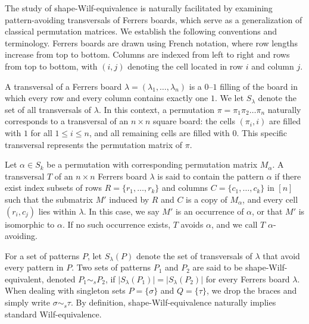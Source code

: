 \documentclass[12pt, english, a4paper]{article}
\newcommand{\card}[1]{\lvert #1 \rvert}
\theoremstyle{plain}
\theoremstyle{definition}
\theoremstyle{remark}
\begin{document}
The study of shape-Wilf-equivalence is naturally facilitated by examining pattern-avoiding transversals of Ferrers boards, which serve as a generalization of classical permutation matrices. We establish the following conventions and terminology. Ferrers boards are drawn using French notation, where row lengths increase from top to bottom. Columns are indexed from left to right and rows from top to bottom, with $(i,j)$ denoting the cell located in row $i$ and column $j$.

A transversal of a Ferrers board $\lambda=(\lambda_1,\dots,\lambda_n)$ is a $0$--$1$ filling of the board in which every row and every column contains exactly one $1$. We let $S_\lambda$ denote the set of all transversals of $\lambda$. In this context, a permutation $\pi=\pi_1\pi_2\dots\pi_n$ naturally corresponds to a transversal of an $n \times n$ square board: the cells $(\pi_i,i)$ are filled with $1$ for all $1 \le i \le n$, and all remaining cells are filled with $0$. This specific transversal represents the permutation matrix of $\pi$.

Let $\alpha \in S_k$ be a permutation with corresponding permutation matrix $M_\alpha$. A transversal $T$ of an $n \times n$ Ferrers board $\lambda$ is said to contain the pattern $\alpha$ if there exist index subsets of rows $R = \{r_1, \dots, r_k\}$ and columns $C = \{c_1, \dots, c_k\}$ in $[n]$ such that the submatrix $M'$ induced by $R$ and $C$ is a copy of $M_\alpha$, and every cell $(r_i, c_j)$ lies within $\lambda$. In this case, we say $M'$ is an occurrence of $\alpha$, or that $M'$ is isomorphic to $\alpha$. If no such occurrence exists, $T$ avoids $\alpha$, and we call $T$ $\alpha$-avoiding.

For a set of patterns $P$, let $S_\lambda(P)$ denote the set of transversals of $\lambda$ that avoid every pattern in $P$. Two sets of patterns $P_1$ and $P_2$ are said to be shape-Wilf-equivalent, denoted $P_1 \sim_s P_2$, if $\card{S_\lambda(P_1)} = \card{S_\lambda(P_2)}$ for every Ferrers board $\lambda$. When dealing with singleton sets $P=\{\sigma\}$ and $Q=\{\tau\}$, we drop the braces and simply write $\sigma \sim_s \tau$. By definition, shape-Wilf-equivalence naturally implies standard Wilf-equivalence.
\end{document}
